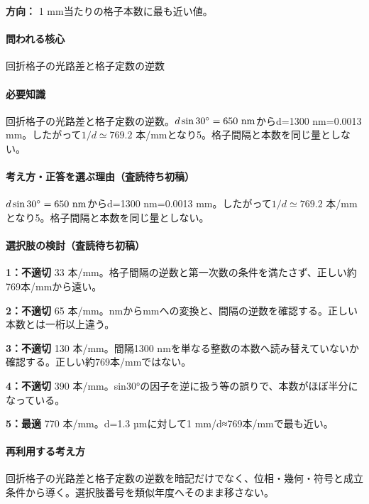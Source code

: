 \noindent\textbf{方向：} 1 mm当たりの格子本数に最も近い値。\par

\paragraph{問われる核心} 回折格子の光路差と格子定数の逆数

\paragraph{必要知識} 回折格子の光路差と格子定数の逆数。\(d\sin30^\circ=650\ {\rm nm}\)からd=\allowbreak{}1300 nm=\allowbreak{}0.0013 mm。したがって\(1/d\simeq769.2\) 本/mmとなり5。格子間隔と本数を同じ量としない。

\paragraph{考え方・正答を選ぶ理由（査読待ち初稿）} \(d\sin30^\circ=650\ {\rm nm}\)からd=\allowbreak{}1300 nm=\allowbreak{}0.0013 mm。したがって\(1/d\simeq769.2\) 本/mmとなり5。格子間隔と本数を同じ量としない。

\paragraph{選択肢の検討（査読待ち初稿）}\mbox{}\par

\noindent\textbf{1：不適切} 33 本/mm。格子間隔の逆数と第一次数の条件を満たさず、正しい約769本/mmから遠い。\par

\noindent\textbf{2：不適切} 65 本/mm。nmからmmへの変換と、間隔の逆数を確認する。正しい本数とは一桁以上違う。\par

\noindent\textbf{3：不適切} 130 本/mm。間隔1300 nmを単なる整数の本数へ読み替えていないか確認する。正しい約769本/mmではない。\par

\noindent\textbf{4：不適切} 390 本/mm。sin30°の因子を逆に扱う等の誤りで、本数がほぼ半分になっている。\par

\noindent\textbf{5：最適} 770 本/mm。d=\allowbreak{}1.3 µmに対して1 mm/d≈769本/mmで最も近い。\par

\paragraph{再利用する考え方} 回折格子の光路差と格子定数の逆数を暗記だけでなく、位相・幾何・符号と成立条件から導く。選択肢番号を類似年度へそのまま移さない。

